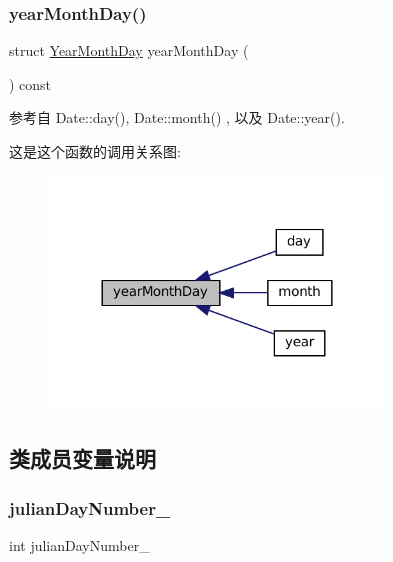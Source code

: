 \subsubsection{\texorpdfstring{year\+Month\+Day()}{yearMonthDay()}}
{\footnotesize\ttfamily struct \hyperlink{structmuduo_1_1Date_1_1YearMonthDay}{Year\+Month\+Day} year\+Month\+Day (\begin{DoxyParamCaption}{ }\end{DoxyParamCaption}) const}



参考自 Date\+::day(), Date\+::month() , 以及 Date\+::year().

这是这个函数的调用关系图\+:
\nopagebreak
\begin{figure}[H]
\begin{center}
\leavevmode
\includegraphics[width=252pt]{classmuduo_1_1Date_ae6a6f4dbc56d9751b6c96d1756a0cece_icgraph}
\end{center}
\end{figure}


\subsection{类成员变量说明}
\mbox{\label{classmuduo_1_1Date_a3ac459925d74b2967686d6d9178c107f}} 
\subsubsection{\texorpdfstring{julian\+Day\+Number\+\_\+}{julianDayNumber\_}}
{\footnotesize\ttfamily int julian\+Day\+Number\+\_\+\hspace{0.3cm}{\ttfamily [private]}}



